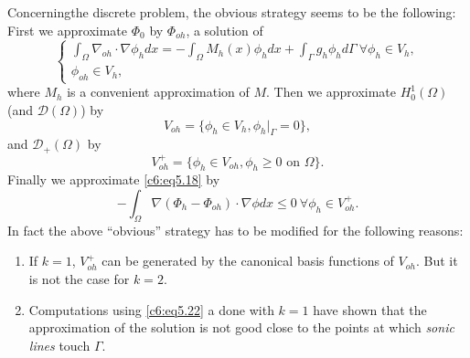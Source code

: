 Concerning\pageoriginale  the discrete problem, the obvious strategy seems to be the 
following: First we approximate $\Phi_0$ by $\Phi_{oh}$, a solution of   
\begin{equation}
\begin{cases}
\int_\Omega \nabla_{oh} \cdot \nabla \phi_h dx = - 
\int_\Omega M_h (x) \phi_h dx + \int_\Gamma g_h \phi_h d \Gamma ~ 
\forall \phi_h \in V_h,\\  
\phi_{oh} \in V_h,
\end{cases}
\tag{5.20}\label{c6:eq5.20}
\end{equation}
where $M_h$ is a convenient approximation of $M$. Then we approximate 
$H^1_0 (\Omega)$ (and $\mathscr{D} (\Omega)$) by  
$$
V_{oh} = \{\phi_h \in V_h, \phi_h |_\Gamma =0 \},
$$
and $\mathscr{D}_+ (\Omega)$ by 
\begin{equation}
V^+_{oh} = \{\phi_h \in V_{oh}, \phi_h \geq 0 \text{ on } \Omega 
\}. \tag{5.21}\label{c6:eq5.21} 
\end{equation}
Finally we approximate \eqref{c6:eq5.18} by  
\begin{equation}
- \int_\Omega \nabla (\Phi_h - \Phi_{oh}) \cdot \nabla 
\phi dx \leq 0 ~ \forall \phi_h \in V^+_{oh} .  
\tag{5.22}\label{c6:eq5.22}  
\end{equation}
In fact the above ``obvious'' strategy has to be modified for the 
following reasons: 
\begin{enumerate}[(1)]
\item If $k=1$, $V^+_{oh}$ can be generated by the canonical basis 
functions of $V_{oh}$. But it is not the case for $k=2$. 
\item Computations using \eqref{c6:eq5.22} a done with $k=1$ have shown 
that the approximation of the solution is not good close to the points 
at which {\em sonic lines}  touch $\Gamma$.   
\end{enumerate}


